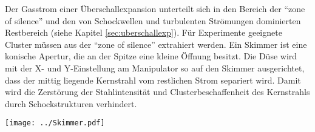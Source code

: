 Der Gasstrom einer Überschallexpansion unterteilt sich in den Bereich der \enquote{zone of silence} und den von Schockwellen und turbulenten Strömungen dominierten Restbereich (siehe Kapitel \ref{sec:uberschallexp}). Für Experimente geeignete Cluster müssen aus der \enquote{zone of silence} extrahiert werden. Ein Skimmer ist eine konische Apertur, die an der Spitze eine kleine Öffnung besitzt. Die Düse wird mit der X- und Y-Einstellung am Manipulator so auf den Skimmer ausgerichtet, dass der mittig liegende Kernstrahl vom restlichen Strom separiert wird. Damit wird die Zerstörung der Stahlintensität und Clusterbeschaffenheit des Kernstrahls durch Schockstrukturen verhindert. 
\begin{center}
\begin{minipage}{\linewidth}
\centering
\texttt{[image: ../Skimmer.pdf]}%
 \label{fig:Skimmer}
\end{minipage} 
\end{center} 

